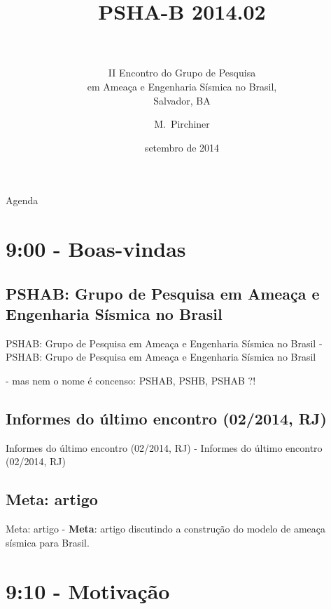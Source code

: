 \documentclass[ucs,8pt]{beamer}
\title[PSHAB Salvador] %
{PSHA-B 2014.02 \\~}
\subtitle{II Encontro do Grupo de Pesquisa \\ 
em Ameaça e Engenharia Sísmica no Brasil, \\
Salvador, BA}
\author[Pirchiner, Marlon] %
{M.~Pirchiner }
\institute[IAG-USP / EMAp-FGV] %
{\scriptsize{Centro de Sismologia-USP / EMAp-FGV}}
\date[ Setembro, 2014] %
{setembro de 2014}
\begin{document}
\begin{frame}[plain]
  \titlepage
\end{frame}

\begin{frame}{Agenda}
 	\scriptsize{
   		\tableofcontents
 	}
\end{frame}


\section{9:00 - Boas-vindas}

	\subsection{PSHAB: Grupo de Pesquisa em Ameaça e Engenharia Sísmica no Brasil}
	\begin{frame}{PSHAB: Grupo de Pesquisa em Ameaça e Engenharia Sísmica no Brasil}
		- PSHAB: Grupo de Pesquisa em Ameaça e Engenharia Sísmica no Brasil
		
		- mas nem o nome é concenso: PSHAB, PSHB, PSHAB ?!
	\end{frame}


	\subsection{Informes do último encontro (02/2014, RJ)}
	\begin{frame}{Informes do último encontro (02/2014, RJ)}
		- Informes do último encontro (02/2014, RJ)
	\end{frame}

	
	\subsection{Meta: artigo}
	\begin{frame}{Meta: artigo}
		- \textbf{Meta}: artigo discutindo a construção do modelo de ameaça sísmica
		para Brasil.
	\end{frame}


\section{9:10 - Motivação}
\end{document}
